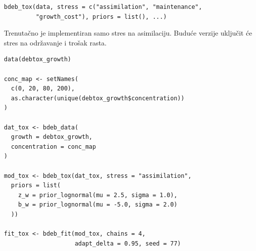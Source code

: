 \documentclass[11pt,a4paper]{article}
\begin{document}
\begin{lstlisting}
bdeb_tox(data, stress = c("assimilation", "maintenance",
         "growth_cost"), priors = list(), ...)
\end{lstlisting}

Trenutačno je implementiran samo stres na asimilaciju.  Buduće verzije
uključit će stres na održavanje i trošak rasta.

\begin{lstlisting}
data(debtox_growth)

conc_map <- setNames(
  c(0, 20, 80, 200),
  as.character(unique(debtox_growth$concentration))
)

dat_tox <- bdeb_data(
  growth = debtox_growth,
  concentration = conc_map
)

mod_tox <- bdeb_tox(dat_tox, stress = "assimilation",
  priors = list(
    z_w = prior_lognormal(mu = 2.5, sigma = 1.0),
    b_w = prior_lognormal(mu = -5.0, sigma = 2.0)
  ))

fit_tox <- bdeb_fit(mod_tox, chains = 4,
                    adapt_delta = 0.95, seed = 77)
\end{lstlisting}
\end{document}
